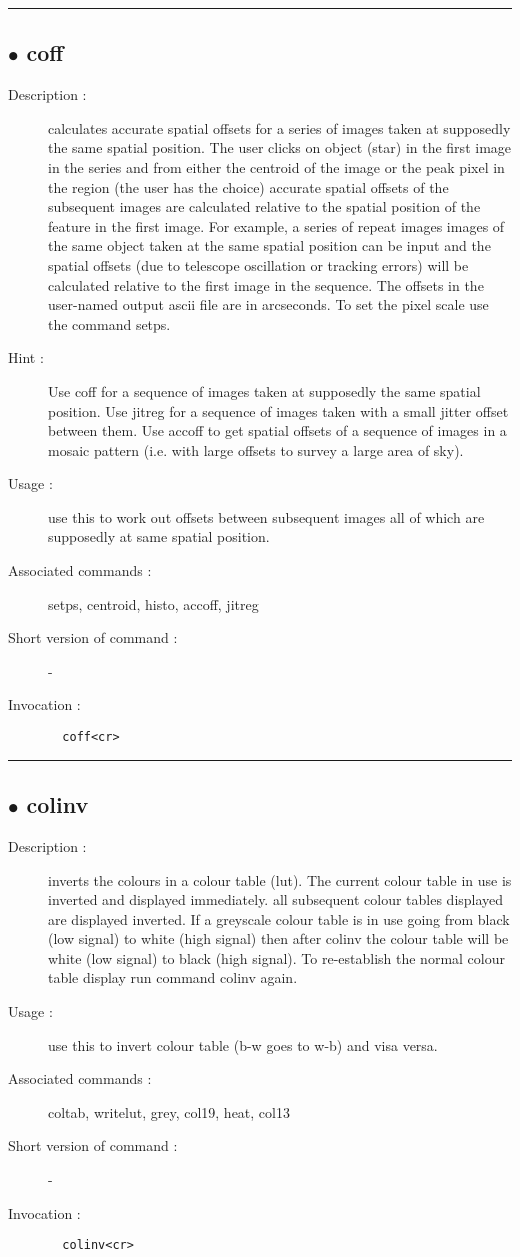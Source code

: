 \hrule \subsection*{$\bullet$ coff}
\begin{description}
\item[Description :] calculates accurate spatial offsets for a series of images taken
at supposedly the same spatial position. The user clicks on object (star)
in the first image in the series and from either the centroid of the
image or the peak pixel in the region (the user has the choice) accurate
spatial offsets of the subsequent images are calculated relative to the
spatial position of the feature in the first image.  For example, a
series of repeat images images of the same object taken at the same
spatial position can be input and the spatial offsets (due to telescope
oscillation or tracking errors) will be calculated relative to the first
image in the sequence.  The offsets in the user-named output ascii file
are in arcseconds.  To set the pixel scale use the command setps. 
\item[Hint :] Use coff for a sequence of images taken at supposedly the same
spatial position. Use jitreg for a sequence of images taken with a small
jitter offset between them. Use accoff to get spatial offsets of a
sequence of images in a mosaic pattern (i.e. with large offsets to survey
a large area of sky).
\item[Usage :] use this to work out offsets between subsequent images all of
which are supposedly at same spatial position.
\item[Associated commands :] setps, centroid, histo, accoff, jitreg
\item[Short version of command :] -
\item[Invocation :]

\verb+  coff<cr> +\end{description}

\hrule \subsection*{$\bullet$ colinv}
\begin{description}
\item[Description :] inverts the colours in a colour table (lut).  The current colour
table in use is inverted and displayed immediately.  all subsequent
colour tables displayed are displayed inverted.  If a greyscale colour
table is in use going from black (low signal) to white (high signal) then
after colinv the colour table will be white (low signal) to black (high
signal).  To re-establish the normal colour table display run command
colinv again.
\item[Usage :] use this to invert colour table (b-w goes to w-b) and visa versa.
\item[Associated commands :] coltab, writelut, grey, col19, heat, col13
\item[Short version of command :] -
\item[Invocation :]

\verb+  colinv<cr> +\end{description}

